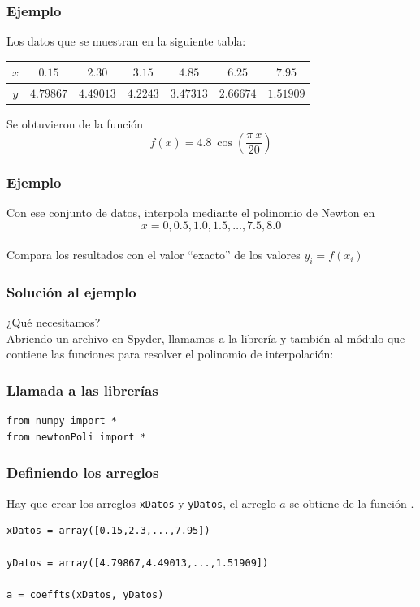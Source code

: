 \begin{frame}
\frametitle{Ejemplo}
Los datos que se muestran en la siguiente tabla:
\begin{table}[htbp]
\centering \small
\begin{tabulary}{15cm}{c | c | c | c | c | c | c}
$x$ & $0.15$ & $2.30$ & $3.15$ & $4.85$ & $6.25$ & $7.95$ \\
\midrule $y$ & $4.79867$ & $4.49013$ & $4.2243$ & $3.47313$ & $2.66674$ & $1.51909$
\end{tabulary}
\end{table}
Se obtuvieron de la función
\[ f(x) = 4.8 \: \cos \left( \dfrac{\pi \: x}{20} \right)\]
\end{frame}
\begin{frame}
\frametitle{Ejemplo}
Con ese conjunto de datos, interpola mediante el polinomio de Newton en
\[ x=0, 0.5, 1.0, 1.5, \ldots,7.5, 8.0 \]
\\
\bigskip
Compara los resultados con el valor \enquote{exacto} de los valores $y_{i} = f(x_{i})$
\end{frame}
\begin{frame}[fragile]
\frametitle{Solución al ejemplo}
¿Qué necesitamos?
\\
\bigskip
Abriendo un archivo en Spyder, llamamos a la librería  y también al módulo  que contiene las funciones para resolver el polinomio de interpolación:
\end{frame}
\begin{frame}[fragile]
\frametitle{Llamada a las librerías}
\begin{lstlisting}[caption=Llamando a las librerías y módulos, style=FormattedNumber, basicstyle=\linespread{1.1}\ttfamily=\small, columns=fullflexible]
from numpy import *
from newtonPoli import *
\end{lstlisting}
\end{frame}
\begin{frame}[fragile]
\frametitle{Definiendo los arreglos}
Hay que crear los arreglos \texttt{xDatos} y \texttt{yDatos}, el arreglo $a$ se obtiene de la función .
\begin{lstlisting}[caption=Nombre Codigo, style=FormattedNumber, basicstyle=\linespread{1.1}\ttfamily=\small, columns=fullflexible]
xDatos = array([0.15,2.3,...,7.95])

yDatos = array([4.79867,4.49013,...,1.51909])

a = coeffts(xDatos, yDatos)
\end{lstlisting}
\end{frame}
